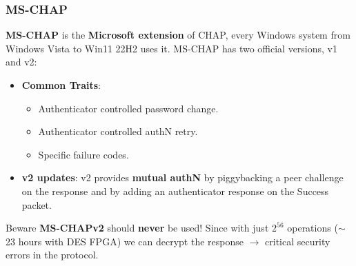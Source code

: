\begin{customquote}
\vspace{-0.4cm}
\subsubsection{MS-CHAP}
\textbf{MS-CHAP} is the \textbf{Microsoft extension} of CHAP, every Windows system from Windows Vista to Win11 22H2 uses it. MS-CHAP has two official versions, v1 and v2:
\begin{itemize}
    \item \textbf{Common Traits}:
    \begin{itemize}
        \item Authenticator controlled password change.
        \item Authenticator controlled authN retry.
        \item Specific failure codes.
    \end{itemize}
    \item \textbf{v2 updates}: v2 provides \textbf{mutual authN} by piggybacking a peer challenge on the response and by adding an authenticator response on the Success packet.
\end{itemize}
\vspace{-1cm}
\begin{quotebox-red}{Beware}
    \textbf{MS-CHAPv2} should \textbf{never} be used! Since with just \(2^{56}\) operations (\(\sim\) 23 hours with DES
FPGA) we can decrypt the response \(\rightarrow \) critical security errors in the protocol.

\end{quotebox-red}
\end{customquote}

